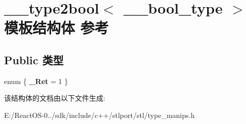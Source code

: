 \hypertarget{struct____type2bool}{}\section{\+\_\+\+\_\+type2bool$<$ \+\_\+\+\_\+bool\+\_\+type $>$ 模板结构体 参考}
\label{struct____type2bool}
\subsection*{Public 类型}
\begin{DoxyCompactItemize}
\item 
\mbox{\label{struct____type2bool_a8f54e9c4ca8eca2fba9d61a05cfe36e1}} 
enum \{ {\bfseries \+\_\+\+Ret} = 1
 \}
\end{DoxyCompactItemize}


该结构体的文档由以下文件生成\+:\begin{DoxyCompactItemize}
\item 
E\+:/\+React\+O\+S-\/0../sdk/include/c++/stlport/stl/type\+\_\+manips.\+h\end{DoxyCompactItemize}
